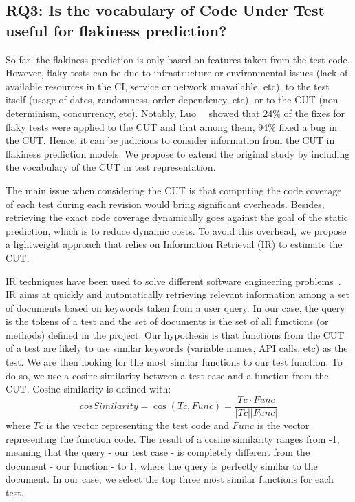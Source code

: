 \subsection{RQ3: Is the vocabulary of Code Under Test useful for flakiness prediction?}
So far, the flakiness prediction is only based on features taken from the test code. 
However, flaky tests can be due to infrastructure or environmental issues (\eg lack of available resources in the CI, service or network unavailable, etc), to the test itself (\eg usage of dates, randomness, order dependency, etc), or to the CUT (\eg non-determinism, concurrency, etc). 
Notably, Luo~\etal~\cite{Luo2014} showed that 24\% of the fixes for flaky tests were applied to the CUT and that among them, 94\% fixed a bug in the CUT. 
Hence, it can be judicious to consider information from the CUT in flakiness prediction models. 
We propose to extend the original study by including the vocabulary of the CUT in test representation.

The main issue when considering the CUT is that computing the code coverage of each test during each revision would bring significant overheads. 
Besides, retrieving the exact code coverage dynamically goes against the goal of the static prediction, which is to reduce dynamic costs.
To avoid this overhead, we propose a lightweight approach that relies on Information Retrieval (IR) to estimate the CUT. 

IR techniques have been used to solve different software engineering problems~\cite{Saha2014,Palomba2018,Azizi2018}. 
IR aims at quickly and automatically retrieving relevant information among a set of documents based on keywords taken from a user query. 
In our case, the query is the tokens of a test and the set of documents is the set of all functions (or methods) defined in the project. 
Our hypothesis is that functions from the CUT of a test are likely to use similar keywords (\ie variable names, API calls, etc) as the test. We are then looking for the most similar functions to our test function. To do so, we use a cosine similarity between a test case and a function from the CUT. Cosine similarity is defined with: 
\[cosSimilarity = \cos (Tc, Func) = \frac{Tc \cdot Func}{|Tc| |Func|}\]
where $Tc$ is the vector representing the test code and $Func$ is the vector representing the function code.
The result of a cosine similarity ranges from -1, meaning that the query - our test case - is completely different from the document - our function - to 1, where the query is perfectly similar to the document. 
In our case, we select the top three most similar functions for each test. 

